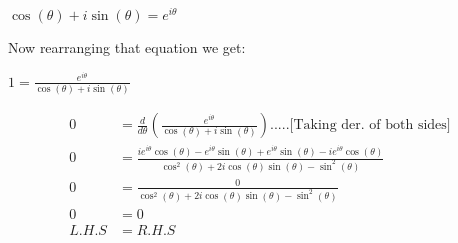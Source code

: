\documentclass[14pt]{extreport}
\begin{document}
$\displaystyle \cos{(\theta)} + i \sin{(\theta)} = e^{i\theta}$
\newline


Now rearranging that equation we get:
\newline


$\displaystyle 1 = \frac{e^{i\theta}}{\cos{(\theta)} + i \sin{(\theta)}}$


\begin{align*}0 &= \frac{d}{d\theta}\left(\frac{e^{i\theta}}{\cos{(\theta)} + i\sin{(\theta)}}\right).....\text{[Taking der. of both sides]} \\0 &= \frac{ie^{i\theta}\cos{(\theta)} - e^{i\theta}\sin{(\theta)} + e^{i\theta}\sin{(\theta)} - ie^{i\theta}\cos{(\theta)}}{\cos^{2}{(\theta)} + 2 i \cos{(\theta)}\sin{(\theta)} - \sin^{2}{(\theta)}}\\ 0 &= \frac{0}{\cos^{2}{(\theta)} + 2 i \cos{(\theta)}\sin{(\theta)} - \sin^{2}{(\theta)}}\\ 0 &= 0 \\ L.H.S &= R.H.S  \end{align*}

\text{[Q.E.D.]}
\end{document}
